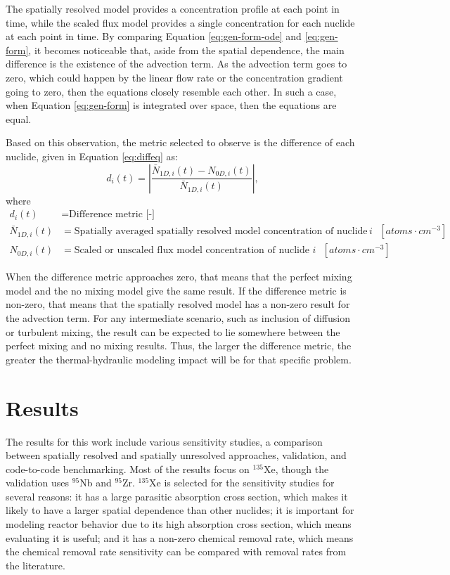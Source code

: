 \documentclass{style/nseJournal}
\begin{document}
The spatially resolved model provides a concentration profile at each point in time, while the scaled flux model provides a single concentration for each nuclide at each point in time.
By comparing Equation \eqref{eq:gen-form-ode} and \eqref{eq:gen-form}, it becomes noticeable that, aside from the spatial dependence, the main difference is the existence of the advection term.
As the advection term goes to zero, which could happen by the linear flow rate or the concentration gradient going to zero, then the equations closely resemble each other.
In such a case, when Equation \eqref{eq:gen-form} is integrated over space, then the equations are equal.

Based on this observation, the metric selected to observe is the difference of each nuclide, given in Equation \eqref{eq:diffeq} as:
\begin{equation}
    d_i(t) = \left| \frac{\bar{N}_{1D, i}(t) - N_{0D, i}(t)}{\bar{N}_{1D, i}(t)} \right|,
    \label{eq:diffeq}
\end{equation}
where
\begin{align}
    d_i(t) &= \text{Difference metric [-]} \nonumber \\
    \bar{N}_{1D, i}(t) &= \text{Spatially averaged spatially resolved model concentration of nuclide $i$ $[atoms \cdot cm^{-3}]$} \nonumber \\
    N_{0D, i}(t) &= \text{Scaled or unscaled flux model concentration of nuclide $i$ $[atoms \cdot cm^{-3}]$}.
\end{align}

When the difference metric approaches zero, that means that the perfect mixing model and the no mixing model give the same result.
If the difference metric is non-zero, that means that the spatially resolved model has a non-zero result for the advection term.
For any intermediate scenario, such as inclusion of diffusion or turbulent mixing, the result can be expected to lie somewhere between the perfect mixing and no mixing results.
Thus, the larger the difference metric, the greater the thermal-hydraulic modeling impact will be for that specific problem.

\section{Results}

The results for this work include various sensitivity studies, a comparison between spatially resolved and spatially unresolved approaches, validation, and code-to-code benchmarking.
Most of the results focus on $^{135}$Xe, though the validation uses $^{95}$Nb and $^{95}$Zr.
$^{135}$Xe is selected for the sensitivity studies for several reasons: it has a large parasitic absorption cross section, which makes it likely to have a larger spatial dependence than other nuclides; it is important for modeling reactor behavior due to its high absorption cross section, which means evaluating it is useful; and it has a non-zero chemical removal rate, which means the chemical removal rate sensitivity can be compared with removal rates from the literature.
\end{document}
